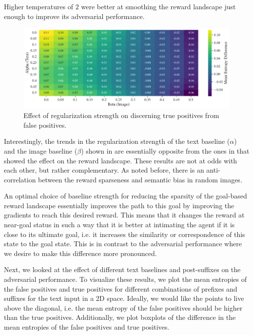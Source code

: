 Higher temperatures of \(2\) were better at smoothing the reward landscape just enough to improve its adversarial performance.

\begin{figure}[H]
    \centering
    \includegraphics[width=\textwidth]{images/alpha_beta_adversarial.pdf}
    \caption{Effect of regularization strength on discerning true positives from false positives.}
    \label{fig:clip-alpha-beta-adversarial}
\end{figure}

Interestingly, the trends in the regularization strength of the text baseline (\(\alpha\)) and the image baseline (\(\beta\)) shown in  are essentially opposite from the ones in  that showed the effect on the reward landscape.
These results are not at odds with each other, but rather complementary. 
As noted before, there is an anti-correlation between the reward sparseness and semantic bias in random images.

An optimal choice of baseline strength for reducing the sparsity of the goal-based reward landscape essentially improves the path to this goal by improving the gradients to reach this desired reward.
This means that it changes the reward at near-goal status in such a way that it is better at intimating the agent if it is close to its ultimate goal, i.e. it increases the similarity or correspondence of this state to the goal state.
This is in contrast to the adversarial performance where we desire to make this difference more pronounced.

Next, we looked at the effect of different text baselines and post-suffixes on the adversarial performance.
To visualize these results, we plot the mean entropies of the false positives and true positives for different combinations of prefixes and suffixes for the text input in a 2D space.
Ideally, we would like the points to live above the diagonal, i.e. the mean entropy of the false positives should be higher than the true positives.
Additionally, we plot boxplots of the difference in the mean entropies of the false positives and true positives.

